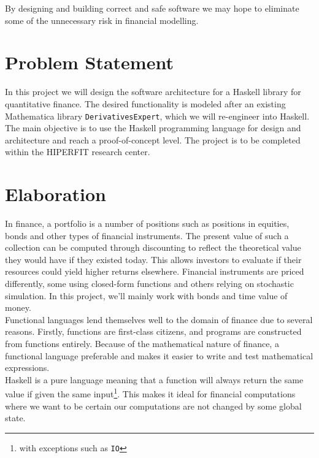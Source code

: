 \documentclass[11pt]{article}
\begin{document}
By designing and building correct and safe software we may hope to eliminate some
of the unnecessary risk in financial modelling.

\section*{Problem Statement}

In this project we will design the software architecture for a Haskell library for quantitative finance.
The desired functionality is modeled after an existing Mathematica library {\tt DerivativesExpert}, which
we will re-engineer into Haskell.
The main objective is to use the Haskell programming language for design and architecture and reach a proof-of-concept level.
The project is to be completed within the HIPERFIT research center.

\section*{Elaboration}

In finance, a portfolio is a number of positions such as positions in equities, bonds and other
types of financial instruments. The present value of such a collection can be computed through
discounting to reflect the theoretical value they would have if they existed today. This allows
investors to evaluate if their resources could yield higher returns elsewhere.
Financial instruments are priced differently, some using closed-form functions and
others relying on stochastic simulation. In this project, we'll mainly work with bonds and
time value of money.\\

Functional languages lend themselves well to the domain of finance due
to several reasons. Firstly, functions are first-class citizens, and programs are constructed
from functions entirely. Because of the mathematical nature of finance, a functional
language preferable and makes it easier to write and test mathematical expressions.\\

Haskell is a pure language meaning that a function will always return the same value
if given the same input\footnote{with exceptions such as {\tt IO}}. This makes it ideal for
financial computations where we want to be certain our computations are not changed by some
global state.\\

\end{document}
